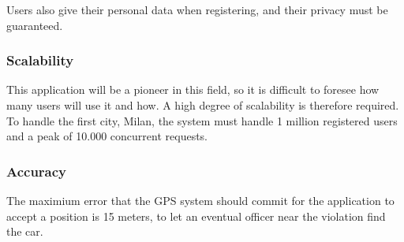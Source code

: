     Users also give their personal data when registering, and their privacy must be guaranteed.

\subsubsection{Scalability}
    This application will be a pioneer in this field, so it is difficult to foresee how many users will
    use it and how. A high degree of scalability is therefore required. To handle the first city, Milan,
    the system must handle 1 million registered users and a peak of 10.000 concurrent requests.

\subsubsection{Accuracy}
    The maximium error that the GPS system should commit for the application to accept a position is 15 meters,
    to let an eventual officer near the violation find the car.
